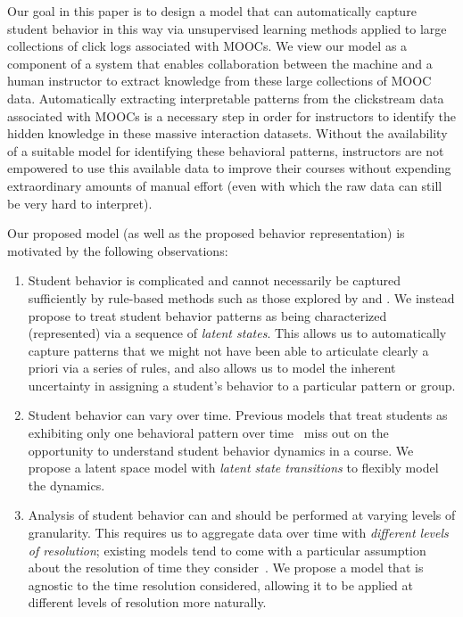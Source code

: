 Our goal in this paper is to design a model that can automatically capture
student behavior in this way via unsupervised learning methods applied to
large collections of click logs associated with MOOCs. We view our model
as a component of a system that enables collaboration between the machine
and a human instructor to extract knowledge from these large collections of
MOOC data. Automatically extracting interpretable patterns from the
clickstream data associated with MOOCs is a necessary step in order for
instructors to identify the hidden knowledge in these massive interaction
datasets. Without the availability of a suitable model for identifying
these behavioral patterns, instructors are not empowered to use this
available data to improve their courses without expending extraordinary
amounts of manual effort (even with which the raw data can still be very hard to interpret). 

Our proposed model (as well as the proposed behavior representation) is motivated by the following observations:
\begin{enumerate}
  \item Student behavior is complicated and cannot necessarily be captured
      sufficiently by rule-based methods such as those explored by
      \citet{Kizilcec:2013:LAK} and \citet{Davis:2016:EDM}. We instead
      propose to treat student behavior patterns as being characterized
      (represented) via a sequence of \emph{latent states}. This allows us
      to automatically capture patterns that we might not have been able to
      articulate clearly a priori via a series of rules, and also allows us
      to model the inherent uncertainty in assigning a student's behavior
      to a particular pattern or group.
  \item Student behavior can vary over time. Previous models that treat students
      as exhibiting only one behavioral pattern over
      time~\cite{Faucon:2016:EDM} miss out on the opportunity to understand
      student behavior dynamics in a course. We propose a latent space
      model with {\em latent state transitions} to flexibly model the
      dynamics.
  \item Analysis of student behavior can and should be performed at varying
      levels of granularity. This requires us to aggregate data over time
      with \emph{different levels of resolution}; existing models tend to come
      with a particular assumption about the resolution of time they
      consider~\cite{Faucon:2016:EDM, Kizilcec:2013:LAK, Shih:2010:EDM}. We
      propose a model that is agnostic to the time resolution considered,
      allowing it to be applied at different levels of resolution more
      naturally.
\end{enumerate}

